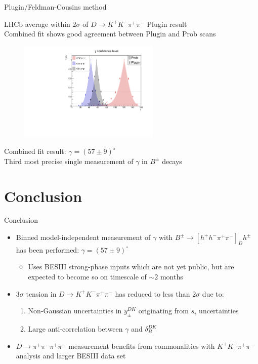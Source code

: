 \documentclass[xcolor={dvipsnames}]{beamer}
\begin{document}
\begin{frame}{Plugin/Feldman-Cousins method}
  \begin{center}
    LHCb average within $2\sigma$ of $D\to K^+K^-\pi^+\pi^-$ Plugin result \\
    Combined fit shows good agreement between Plugin and Prob scans
  \end{center}
  \begin{figure}
    \centering
    \includegraphics[width=0.6\textwidth]{Plots/gamma_plugin_scan.pdf}
  \end{figure}
  \vspace{-0.3cm}
  \begin{center}
    Combined fit result: $\gamma = (57 \pm 9)^\circ$\\
    Third most precise single measurement of $\gamma$ in $B^\pm$ decays
  \end{center}
\end{frame}

\section{Conclusion}
\begin{frame}{Conclusion}
  \vspace{-0.1cm}
  \begin{itemize}
    \setlength\itemsep{1.5em}
    \item{Binned model-independent measurement of $\gamma$ with $B^\pm\to[h^+h^-\pi^+\pi^-]_Dh^\pm$ has been performed: $\gamma = (57 \pm 9)^\circ$}
    \begin{itemize}
      \item{Uses BESIII strong-phase inputs which are not yet public, but are expected to become so on timescale of $\sim2$ months}
    \end{itemize}
    \item{$3\sigma$ tension in $D\to K^+K^-\pi^+\pi^-$ has reduced to less than $2\sigma$ due to:}
    \begin{enumerate}
      \item{Non-Gaussian uncertainties in $y_\pm^{DK}$ originating from $s_i$ uncertainties}
      \item{Large anti-correlation between $\gamma$ and $\delta_B^{DK}$}
    \end{enumerate}
    \item{$D\to\pi^+\pi^-\pi^+\pi^-$ measurement benefits from commonalities with $K^+K^-\pi^+\pi^-$ analysis and larger BESIII data set}
  \end{itemize}
\end{frame}
\end{document}
